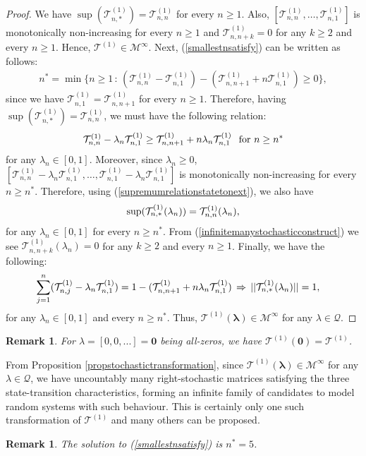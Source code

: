 \documentclass[a4paper,12pt]{article}
\newtheorem{rem}[thm]{Remark}
\def\T{\mathcal{T}}
\begin{document}
\begin{proof}
We have $\sup(\T^{(1)}_{n,*})=\T^{(1)}_{n,n}$ for every $n\geq 1$. Also, $[\T^{(1)}_{n,n},\ldots,\T^{(1)}_{n,1}]$ is monotonically non-increasing for every $n\geq 1$ and $\T^{(1)}_{n,n+k} = 0$ for any $k\geq 2$ and every $n\geq 1$. Hence, $\T^{(1)}\in\mathcal{M}^{\infty}$. Next, (\ref{smallestnsatisfy}) can be written as follows:
\begin{align}
n^* =  \min\{n \geq 1 \, : \, (\T^{(1)}_{n,n} - \T^{(1)}_{n,1}) - (\T^{(1)}_{n,n+1} + n\T^{(1)}_{n,1}) \geq 0 \}, \label{smallestnsatisfyexpanded}
\end{align}
since we have $\T^{(1)}_{n,1} = \T^{(1)}_{n,n+1}$ for every $n\geq 1$. Therefore, having $\sup(\T^{(1)}_{n,*})=\T^{(1)}_{n,n}$, we must have the following relation:
\begin{align}
\T^{(1)}_{n,n} - \lambda_n\T^{(1)}_{n,1} \geq \T^{(1)}_{n,n+1} + n\lambda_n\T^{(1)}_{n,1} \hspace{0.1in} \text{for $n\geq n^*$} \label{supremumrelationstatetonext}
\end{align}
for any $\lambda_n\in[0,1]$. Moreover, since $\lambda_n\geq 0$, $[\T^{(1)}_{n,n} - \lambda_n\T^{(1)}_{n,1},\ldots,\T^{(1)}_{n,1} - \lambda_n\T^{(1)}_{n,1}]$ is monotonically non-increasing for every $n\geq n^*$. Therefore, using (\ref{supremumrelationstatetonext}), we also have 
\begin{align}
\sup(\T^{(1)}_{n,*}(\lambda_n))=\T^{(1)}_{n,n}(\lambda_n), \notag 
\end{align}
for any $\lambda_n\in[0,1]$ for every $n\geq n^*$. From (\ref{infinitemanystochasticconstruct}) we see $\T^{(1)}_{n,n+k}(\lambda_n) = 0$ for any $k\geq 2$ and every $n\geq 1$. Finally, we have the following:
\begin{align}
\sum_{j=1}^n (\T^{(1)}_{n,j} - \lambda_n\T^{(1)}_{n,1} ) &= 1 - (\T^{(1)}_{n,n+1} + n\lambda_n\T^{(1)}_{n,1}) \, \Rightarrow \, || \T^{(1)}_{n,*}(\lambda_n) || = 1, \notag
\end{align}
for any $\lambda_n\in[0,1]$ and every $n\geq n^*$. Thus, $\T^{(1)}(\mathbf{\lambda}) \in \mathcal{M}^{\infty}$ for any $\lambda\in\mathcal{Q}$.
\end{proof}
\begin{rem}
For $\mathbb{\lambda} = [0,0,...] = \mathbf{0}$ being all-zeros, we have $\T^{(1)}(\mathbf{0}) = \T^{(1)}$.
\end{rem}
From Proposition \ref{propstochastictransformation}, since $\T^{(1)}(\mathbf{\lambda}) \in \mathcal{M}^{\infty}$ for any $\lambda\in\mathcal{Q}$, we have uncountably many right-stochastic matrices satisfying the three state-transition characteristics, forming an infinite family of candidates to model random systems with such behaviour. This is certainly only one such transformation of $\T^{(1)}$ and many others can be proposed.
\begin{rem}
The solution to (\ref{smallestnsatisfy}) is $n^* = 5$.
\end{rem}
\end{document}

